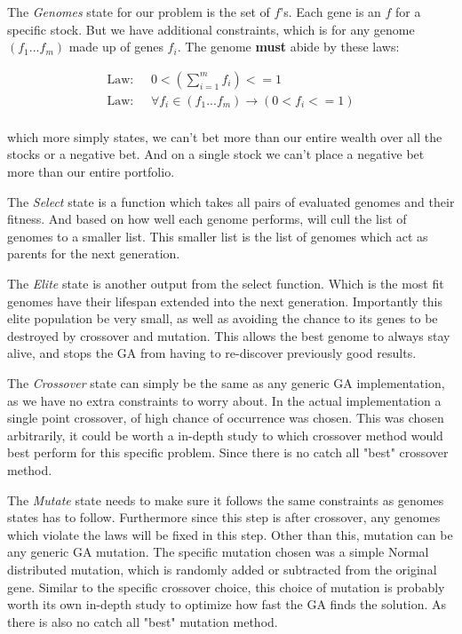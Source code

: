 \documentclass[11pt]{article}
\begin{document}
    The \textit{Genomes} state for our problem is the set of \(f\)'s. Each gene is an
    \(f\) for a specific stock. But we have additional constraints, which is for 
    any genome \((f_1...f_m)\) made up of genes \(f_i\). The genome \textbf{must}
    abide by these laws:

    \begin{align*}
        \text{Law: } & \;
        0 < \left(
            \displaystyle\sum^{m}_{i=1} f_i
        \right) <= 1 \\
        \text{Law: } & \;
        \forall f_i \in (f_1...f_m) \to \left(
            0 < f_i <= 1
        \right) \\
    \end{align*}

    which more simply states, we can't bet more than our entire wealth over all the stocks or
    a negative bet. And on a single stock we can't place a negative bet more than our
    entire portfolio.

    The \textit{Select} state is a function which takes all pairs of evaluated genomes
    and their fitness. And based on how well each genome performs, will cull the
    list of genomes to a smaller list. This smaller list is the list of genomes
    which act as parents for the next generation.

    The \textit{Elite} state is another output from the select function. Which is
    the most fit genomes have their lifespan extended into the next generation.
    Importantly this elite population be very small, as well as avoiding the
    chance to its genes to be destroyed by crossover and mutation. \cite{DeJong}
    This allows the best genome to always stay alive, and stops the GA from
    having to re-discover previously good results.

    The \textit{Crossover} state can simply be the same as any generic GA implementation,
    as we have no extra constraints to worry about. In the actual implementation
    a single point crossover, of high chance of occurrence was chosen. This was
    chosen arbitrarily, it could be worth a in-depth study to which crossover
    method would best perform for this specific problem. Since there is no catch all
    "best" crossover method.

    The \textit{Mutate} state needs to make sure it follows the same constraints as
    genomes states has to follow. Furthermore since this step is after crossover,
    any genomes which violate the laws will be fixed in this step. Other than this,
    mutation can be any generic GA mutation. The specific mutation chosen was a
    simple Normal distributed mutation, which is randomly added or subtracted from
    the original gene. Similar to the specific crossover choice, this choice
    of mutation is probably worth its own in-depth study to optimize how fast
    the GA finds the solution. As there is also no catch all "best" mutation method.
\end{document}
